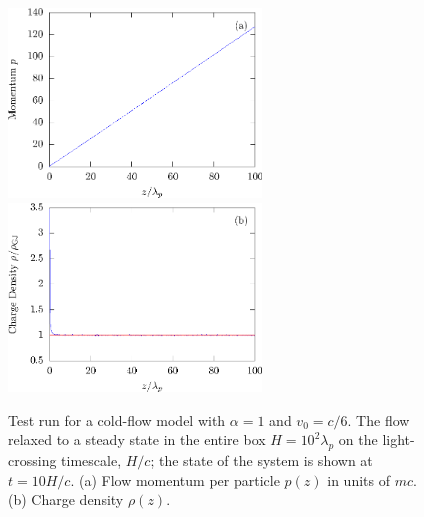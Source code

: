 \begin{figure}%
\begin{center}
  \includegraphics[width=0.6\textwidth]{pics/chap2/f2a.eps} \\
  \includegraphics[width=0.6\textwidth]{pics/chap2/f2b.eps}
  \caption[Test run for a cold flow with $\alpha = 1$]{Test run for a cold-flow
    model with $\alpha=1$ and $v_0=c/6$. The flow relaxed to a steady state in
    the entire box $H=10^2\lambda_p$ on the light-crossing timescale, $H/c$; the
    state of the system is shown at $t = 10H/c$. (a) Flow momentum per particle
    $p(z)$ in units of $mc$. (b) Charge density $\rho(z)$.}
\label{fig:alpha1}
\end{center}
\end{figure}

